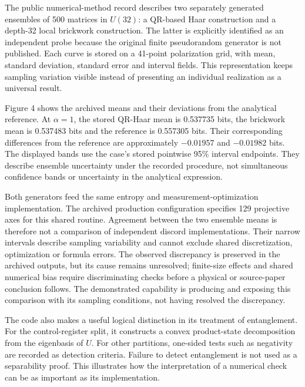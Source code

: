 \documentclass[10pt,a4paper]{article}
\begin{document}
The public numerical-method record describes two separately generated
ensembles of 500 matrices in \(U(32)\): a QR-based Haar construction and
a depth-32 local brickwork construction. The latter is explicitly
identified as an independent probe because the original finite
pseudorandom generator is not published. Each curve is stored on a
41-point polarization grid, with mean, standard deviation, standard
error and interval fields. This representation keeps sampling variation
visible instead of presenting an individual realization as a universal
result.

Figure 4 shows the archived means and their deviations from the
analytical reference. At \(\alpha=1\), the stored QR-Haar mean is
0.537735 bits, the brickwork mean is 0.537483 bits and the reference is
0.557305 bits. Their corresponding differences from the reference are
approximately \(-0.01957\) and \(-0.01982\) bits. The displayed bands
use the case's stored pointwise 95\% interval endpoints. They describe
ensemble uncertainty under the recorded procedure, not simultaneous
confidence bands or uncertainty in the analytical expression.

Both generators feed the same entropy and measurement-optimization
implementation. The archived production configuration specifies 129
projective axes for this shared routine. Agreement between the two
ensemble means is therefore not a comparison of independent discord
implementations. Their narrow intervals describe sampling variability
and cannot exclude shared discretization, optimization or formula
errors. The observed discrepancy is preserved in the archived outputs,
but its cause remains unresolved; finite-size effects and shared
numerical bias require discriminating checks before a physical or
source-paper conclusion follows. The demonstrated capability is
producing and exposing this comparison with its sampling conditions, not
having resolved the discrepancy.

The code also makes a useful logical distinction in its treatment of
entanglement. For the control-register split, it constructs a convex
product-state decomposition from the eigenbasis of \(U\). For other
partitions, one-sided tests such as negativity are recorded as detection
criteria. Failure to detect entanglement is not used as a separability
proof. This illustrates how the interpretation of a numerical check can
be as important as its implementation.
\end{document}
